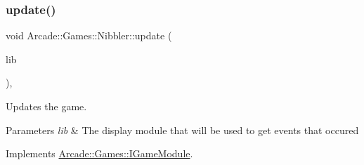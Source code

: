 \subsubsection{\texorpdfstring{update()}{update()}}
{\footnotesize\ttfamily void Arcade\+::\+Games\+::\+Nibbler\+::update (\begin{DoxyParamCaption}\item[{const \mbox{\hyperlink{classArcade_1_1Display_1_1IDisplayModule}{Arcade\+::\+Display\+::\+I\+Display\+Module}} \&}]{lib }\end{DoxyParamCaption})\hspace{0.3cm}{\ttfamily [final]}, {\ttfamily [virtual]}}



Updates the game. 


\begin{DoxyParams}{Parameters}
{\em lib} & The display module that will be used to get events that occured \\
\hline
\end{DoxyParams}


Implements \mbox{\hyperlink{classArcade_1_1Games_1_1IGameModule_a421d1064fcc112dfc7ea025fc7f88aa7}{Arcade\+::\+Games\+::\+I\+Game\+Module}}.


